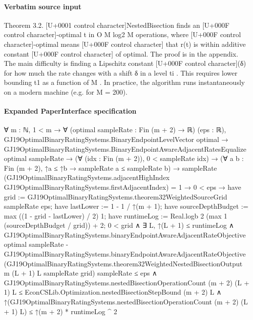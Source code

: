 \documentclass[10pt]{article}
\begin{document}
\paragraph{Verbatim source input}
\begin{ReviewVerbatim}
Theorem 3.2. [U+0001 control character]NestedBisection finds an [U+000F control character]-optimal t
in O M log2 M
operations, where [U+000F control character]-optimal means
[U+000F control character]
that r(t) is within additive constant [U+000F control character] of optimal.
The proof is in the appendix. The main difficulty
is finding a Lipschitz constant [U+000F control character](δ) for how much
the rate changes with a shift δ in a level ti . This
requires lower bounding t1 as a function of M . In
practice, the algorithm runs instantaneously on a
modern machine (e.g. for M = 200).
\end{ReviewVerbatim}


\paragraph{Expanded PaperInterface specification}
\begin{ReviewVerbatim}
∀ {m : ℕ},
  1 < m →
    ∀ (optimal sampleRate : Fin (m + 2) → ℝ) (eps : ℝ),
      GJ19OptimalBinaryRatingSystems.BinaryEndpointLevelVector optimal →
        GJ19OptimalBinaryRatingSystems.BinaryEndpointAwareAdjacentRatesEqualize optimal sampleRate →
          (∀ (idx : Fin (m + 2)), 0 < sampleRate idx) →
            (∀ {a b : Fin (m + 2)}, ↑a ≤ ↑b → sampleRate a ≤ sampleRate b) →
              sampleRate
                    (GJ19OptimalBinaryRatingSystems.adjacentHighIndex
                      GJ19OptimalBinaryRatingSystems.firstAdjacentIndex) =
                  1 →
                0 < eps →
                  have grid := GJ19OptimalBinaryRatingSystems.theorem32WeightedSourceGrid sampleRate eps;
                  have lastLower := 1 - 1 / ↑(m + 1);
                  have sourceDepthBudget := max ((1 - grid - lastLower) / 2) 1;
                  have runtimeLog := Real.logb 2 (max 1 (sourceDepthBudget / grid)) + 2;
                  0 < grid ∧
                    ∃ L,
                      ↑(L + 1) ≤ runtimeLog ∧
                        GJ19OptimalBinaryRatingSystems.binaryEndpointAwareAdjacentRateObjective optimal sampleRate -
                              GJ19OptimalBinaryRatingSystems.binaryEndpointAwareAdjacentRateObjective
                                (GJ19OptimalBinaryRatingSystems.theorem32WeightedNestedBisectionOutput m (L + 1) L
                                  sampleRate grid)
                                sampleRate ≤
                            eps ∧
                          GJ19OptimalBinaryRatingSystems.nestedBisectionOperationCount (m + 2) (L + 1) L ≤
                              EconCSLib.Optimization.nestedBisectionStepBound (m + 2) L ∧
                            ↑(GJ19OptimalBinaryRatingSystems.nestedBisectionOperationCount (m + 2) (L + 1) L) ≤
                              ↑(m + 2) * runtimeLog ^ 2
\end{ReviewVerbatim}
\end{document}
